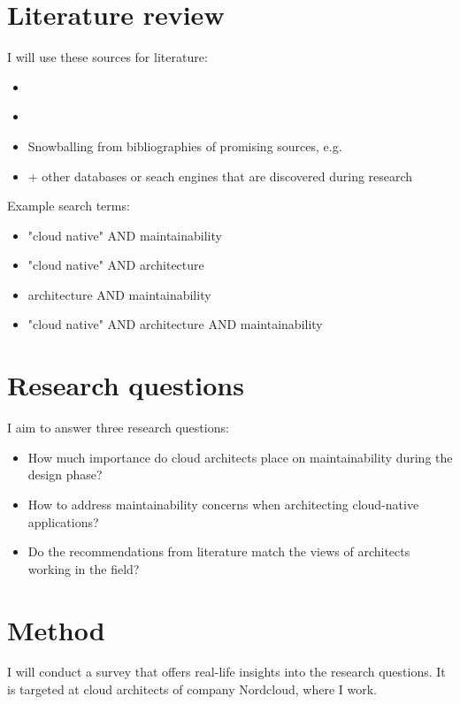 \documentclass[utf8,english]{gradu3}
\begin{document}
\chapter{Literature review}
I will use these sources for literature:
\begin{itemize}
  \item \textcite{jykdok}
  \item \textcite{google-scholar}
  \item Snowballing from bibliographies of promising sources, e.g. \textcite{thesis-time-tracking}
  \item + other databases or seach engines that are discovered during research
\end{itemize}

Example search terms:
\begin{itemize}
  \item "cloud native" AND maintainability
  \item "cloud native" AND architecture
  \item architecture AND maintainability
  \item "cloud native" AND architecture AND maintainability
\end{itemize}


\chapter{Research questions}

I aim to answer three research questions:
\begin{itemize}
  \item How much importance do cloud architects place on maintainability during
        the design phase?
  \item How to address maintainability concerns when architecting cloud-native
        applications?
  \item Do the recommendations from literature match the views of architects
        working in the field?
\end{itemize}


\chapter{Method}

I will conduct a survey that offers real-life insights into the research questions.
It is targeted at cloud architects of company Nordcloud, where I work.
\end{document}
